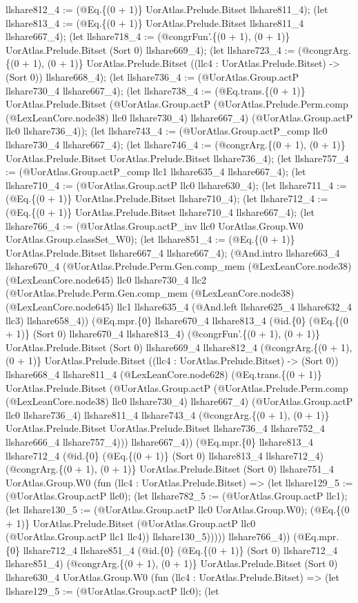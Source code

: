 \documentclass[11pt]{article}
\begin{document}
llshare812\_4 := (@Eq.\{(0 + 1)\} UorAtlas.Prelude.Bitset llshare811\_4); (let llshare813\_4 := (@Eq.\{(0 + 1)\} UorAtlas.Prelude.Bitset llshare811\_4 llshare667\_4); (let llshare718\_4 := (@congrFun'.\{(0 + 1), (0 + 1)\} UorAtlas.Prelude.Bitset (Sort 0) llshare669\_4); (let llshare723\_4 := (@congrArg.\{(0 + 1), (0 + 1)\} UorAtlas.Prelude.Bitset ((llc4 : UorAtlas.Prelude.Bitset) -> (Sort 0)) llshare668\_4); (let llshare736\_4 := (@UorAtlas.Group.actP llshare730\_4 llshare667\_4); (let llshare738\_4 := (@Eq.trans.\{(0 + 1)\} UorAtlas.Prelude.Bitset (@UorAtlas.Group.actP (@UorAtlas.Prelude.Perm.comp (@LexLeanCore.node38) llc0 llshare730\_4) llshare667\_4) (@UorAtlas.Group.actP llc0 llshare736\_4)); (let llshare743\_4 := (@UorAtlas.Group.actP\_comp llc0 llshare730\_4 llshare667\_4); (let llshare746\_4 := (@congrArg.\{(0 + 1), (0 + 1)\} UorAtlas.Prelude.Bitset UorAtlas.Prelude.Bitset llshare736\_4); (let llshare757\_4 := (@UorAtlas.Group.actP\_comp llc1 llshare635\_4 llshare667\_4); (let llshare710\_4 := (@UorAtlas.Group.actP llc0 llshare630\_4); (let llshare711\_4 := (@Eq.\{(0 + 1)\} UorAtlas.Prelude.Bitset llshare710\_4); (let llshare712\_4 := (@Eq.\{(0 + 1)\} UorAtlas.Prelude.Bitset llshare710\_4 llshare667\_4); (let llshare766\_4 := (@UorAtlas.Group.actP\_inv llc0 UorAtlas.Group.W0 UorAtlas.Group.classSet\_W0); (let llshare851\_4 := (@Eq.\{(0 + 1)\} UorAtlas.Prelude.Bitset llshare667\_4 llshare667\_4); (@And.intro llshare663\_4 llshare670\_4 (@UorAtlas.Prelude.Perm.Gen.comp\_mem (@LexLeanCore.node38) (@LexLeanCore.node645) llc0 llshare730\_4 llc2 (@UorAtlas.Prelude.Perm.Gen.comp\_mem (@LexLeanCore.node38) (@LexLeanCore.node645) llc1 llshare635\_4 (@And.left llshare625\_4 llshare632\_4 llc3) llshare658\_4)) (@Eq.mpr.\{0\} llshare670\_4 llshare813\_4 (@id.\{0\} (@Eq.\{(0 + 1)\} (Sort 0) llshare670\_4 llshare813\_4) (@congrFun'.\{(0 + 1), (0 + 1)\} UorAtlas.Prelude.Bitset (Sort 0) llshare669\_4 llshare812\_4 (@congrArg.\{(0 + 1), (0 + 1)\} UorAtlas.Prelude.Bitset ((llc4 : UorAtlas.Prelude.Bitset) -> (Sort 0)) llshare668\_4 llshare811\_4 (@LexLeanCore.node628) (@Eq.trans.\{(0 + 1)\} UorAtlas.Prelude.Bitset (@UorAtlas.Group.actP (@UorAtlas.Prelude.Perm.comp (@LexLeanCore.node38) llc0 llshare730\_4) llshare667\_4) (@UorAtlas.Group.actP llc0 llshare736\_4) llshare811\_4 llshare743\_4 (@congrArg.\{(0 + 1), (0 + 1)\} UorAtlas.Prelude.Bitset UorAtlas.Prelude.Bitset llshare736\_4 llshare752\_4 llshare666\_4 llshare757\_4))) llshare667\_4)) (@Eq.mpr.\{0\} llshare813\_4 llshare712\_4 (@id.\{0\} (@Eq.\{(0 + 1)\} (Sort 0) llshare813\_4 llshare712\_4) (@congrArg.\{(0 + 1), (0 + 1)\} UorAtlas.Prelude.Bitset (Sort 0) llshare751\_4 UorAtlas.Group.W0 (fun (llc4 : UorAtlas.Prelude.Bitset) => (let llshare129\_5 := (@UorAtlas.Group.actP llc0); (let llshare782\_5 := (@UorAtlas.Group.actP llc1); (let llshare130\_5 := (@UorAtlas.Group.actP llc0 UorAtlas.Group.W0); (@Eq.\{(0 + 1)\} UorAtlas.Prelude.Bitset (@UorAtlas.Group.actP llc0 (@UorAtlas.Group.actP llc1 llc4)) llshare130\_5))))) llshare766\_4)) (@Eq.mpr.\{0\} llshare712\_4 llshare851\_4 (@id.\{0\} (@Eq.\{(0 + 1)\} (Sort 0) llshare712\_4 llshare851\_4) (@congrArg.\{(0 + 1), (0 + 1)\} UorAtlas.Prelude.Bitset (Sort 0) llshare630\_4 UorAtlas.Group.W0 (fun (llc4 : UorAtlas.Prelude.Bitset) => (let llshare129\_5 := (@UorAtlas.Group.actP llc0); (let 
\end{document}
